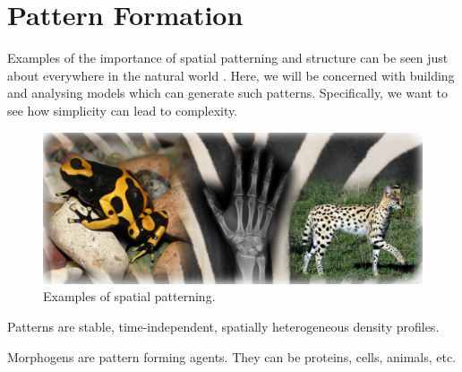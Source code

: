 \chapter{Pattern Formation}
Examples of the importance of spatial patterning and structure can be seen just about everywhere in the natural world . Here, we will be concerned with building and analysing models which can generate such patterns. Specifically, we want to see how simplicity can lead to complexity.
\begin{figure}[!!!h!!!tb]
\centering
\includegraphics[width=\textwidth]{../Pictures/Feathered_composite.png}
\caption{Examples of spatial patterning. \label{Pattern_examples}}
\end{figure}
\begin{defin}
Patterns are stable, time-independent, spatially heterogeneous density profiles.
\end{defin}
\begin{defin}
Morphogens are pattern forming agents. They can be proteins, cells, animals, etc.
\end{defin}

